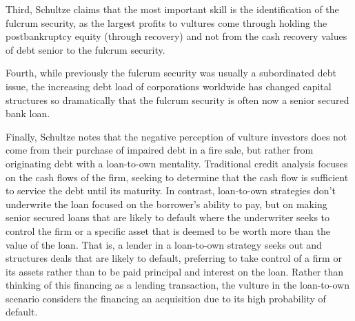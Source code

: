 \documentclass[11pt]{article}
\begin{document}
Third, Schultze claims that the most important skill is the identification of the fulcrum security, as the largest profits to vultures come through holding the postbankruptcy equity (through recovery) and not from the cash recovery values of debt senior to the fulcrum security.

Fourth, while previously the fulcrum security was usually a subordinated debt issue, the increasing debt load of corporations worldwide has changed capital structures so dramatically that the fulcrum security is often now a senior secured bank loan.

Finally, Schultze notes that the negative perception of vulture investors does not come from their purchase of impaired debt in a fire sale, but rather from originating debt with a loan-to-own mentality. Traditional credit analysis focuses on the cash flows of the firm, seeking to determine that the cash flow is sufficient to service the debt until its maturity. In contrast, loan-to-own strategies don't underwrite the loan focused on the borrower's ability to pay, but on making senior secured loans that are likely to default where the underwriter seeks to control the firm or a specific asset that is deemed to be worth more than the value of the loan. That is, a lender in a loan-to-own strategy seeks out and structures deals that are likely to default, preferring to take control of a firm or its assets rather than to be paid principal and interest on the loan. Rather than thinking of this financing as a lending transaction, the vulture in the loan-to-own scenario considers the financing an acquisition due to its high probability of default.
\end{document}
